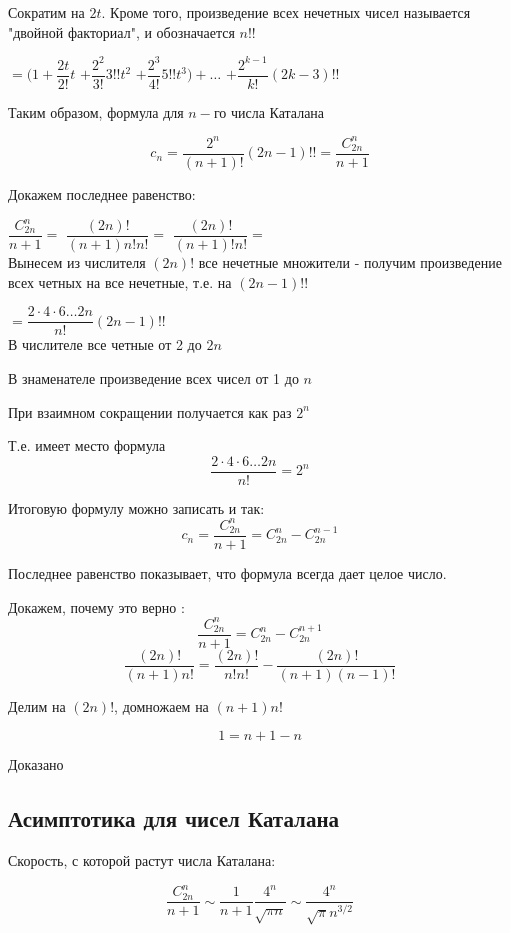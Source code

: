 Сократим на $ 2t $. 
Кроме того, произведение всех нечетных чисел называется "двойной факториал",
и обозначается $ n!! $

$ = (1 + \dfrac{2 t}{2!} t  $
$ + \dfrac{2^{2}}{3!} 3!! t^{2}  $
$ + \dfrac{2^{3}}{4!} 5!! t^{3} ) + \ldots $
$+ \dfrac{2^{k-1}}{k!} (2k-3)!! $

Таким образом, формула для $ n-$го числа Каталана

$$
c_n = \frac{2^n}{(n+1)!} (2n-1)!! = \frac{C_{2n}^n}{n+1} 
$$

Докажем последнее равенство:

$\dfrac{C_{2n}^n}{n+1}  = $
$\dfrac{(2n)!}{(n+1)n!n!} = $
$\dfrac{(2n)!}{(n+1)!n!} = $ \\

Вынесем из числителя $ (2n)! $ все нечетные множители - 
получим произведение всех четных на все нечетные, т.е. на $ (2n-1)!! $

$= \dfrac{2 \cdot 4 \cdot 6 \ldots 2n}{n!} (2n-1)!!$ \\

В числителе все четные от 2 до $ 2n $

В знаменателе произведение всех чисел от 1 до $ n $

При взаимном сокращении получается как раз $ 2^{n} $

Т.е. имеет место формула
$$\dfrac{2 \cdot 4 \cdot 6 \ldots 2n}{n!} = 2^{n}
$$ 

Итоговую формулу можно записать и так:
$$
c_n = \dfrac{C_{2n}^n}{n+1} = C_{2n}^n - C_{2n}^{n-1}
$$

Последнее равенство показывает, что формула всегда дает целое число.

Докажем, почему это верно :
$$
\dfrac{C_{2n}^n}{n+1} = C_{2n}^n - C_{2n}^{n+1}
$$
$$
\dfrac{(2n)!}{(n+1)n!} = \dfrac{(2n)!}{n!n!} - \dfrac{(2n)!}{(n+1)(n-1)!}
$$

Делим на $ (2n)! $, домножаем на $ (n+1)n! $

$$
1 = n + 1 - n
$$

Доказано

\subsection{Асимптотика для чисел Каталана}


Скорость, с которой растут числа Каталана:

$$
\dfrac{C_{2n}^n}{n+1} 
\sim \dfrac{1}{n + 1} \dfrac{4^{n}}{\sqrt{\pi n}} 
\sim \dfrac{4^{n}}{\sqrt{\pi} n^{3/2}}
$$

